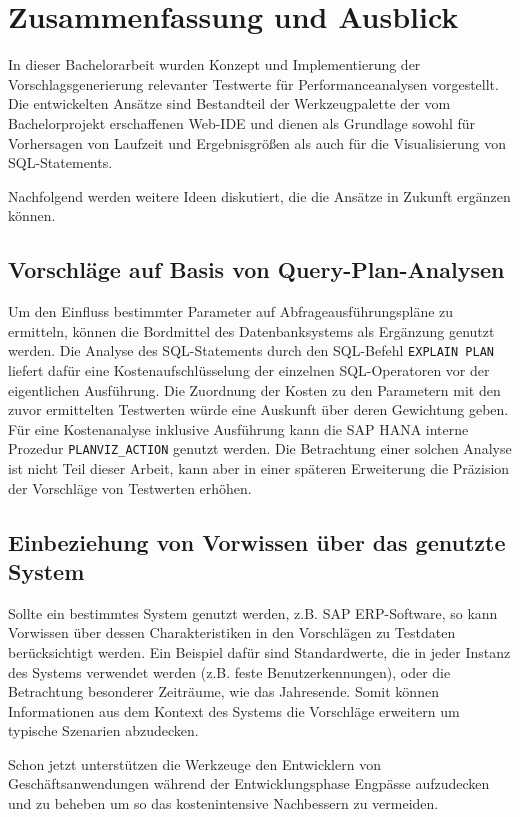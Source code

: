 \section{Zusammenfassung und Ausblick}\label{chap:conclusion}

In dieser Bachelorarbeit wurden Konzept und Implementierung der Vorschlagsgenerierung relevanter Testwerte für Performanceanalysen vorgestellt.
Die entwickelten Ansätze sind Bestandteil der Werkzeugpalette der vom Bachelorprojekt erschaffenen Web-IDE und dienen als Grundlage sowohl für Vorhersagen von Laufzeit und Ergebnisgrößen als auch für die Visualisierung von SQL-Statements.

Nachfolgend werden weitere Ideen diskutiert, die die Ansätze in Zukunft ergänzen können.

\subsection{Vorschläge auf Basis von Query-Plan-Analysen}
Um den Einfluss bestimmter Parameter auf Abfrageausführungspläne zu ermitteln, können die Bordmittel des Datenbanksystems als Ergänzung genutzt werden.
Die Analyse des SQL-Statements durch den SQL-Befehl \texttt{EXPLAIN PLAN} liefert dafür eine Kostenaufschlüsselung der einzelnen SQL-Operatoren vor der eigentlichen Ausführung.
Die Zuordnung der Kosten zu den Parametern mit den zuvor ermittelten Testwerten würde eine Auskunft über deren Gewichtung geben.
Für eine Kostenanalyse inklusive Ausführung kann die SAP HANA interne Prozedur \texttt{PLANVIZ\_ACTION} genutzt werden.
Die Betrachtung einer solchen Analyse ist nicht Teil dieser Arbeit, kann aber in einer späteren Erweiterung die Präzision der Vorschläge von Testwerten erhöhen.

\subsection{Einbeziehung von Vorwissen über das genutzte System}
Sollte ein bestimmtes System genutzt werden, z.B. SAP ERP-Software, so kann Vorwissen über dessen Charakteristiken in den Vorschlägen zu Testdaten berücksichtigt werden.
Ein Beispiel dafür sind Standardwerte, die in jeder Instanz des Systems verwendet werden (z.B. feste Benutzerkennungen), oder die Betrachtung besonderer Zeiträume, wie das Jahresende.
Somit können Informationen aus dem Kontext des Systems die Vorschläge erweitern um typische Szenarien abzudecken.


Schon jetzt unterstützen die Werkzeuge den Entwicklern von Geschäftsanwendungen während der Entwicklungsphase Engpässe aufzudecken und zu beheben um so das kostenintensive Nachbessern zu vermeiden.